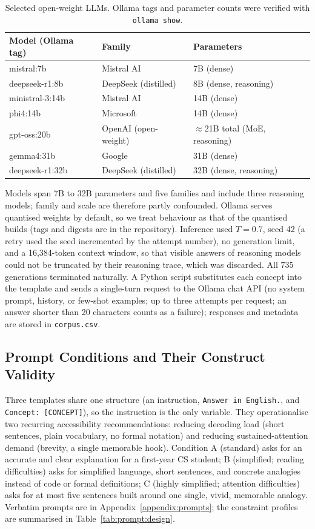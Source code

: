 \documentclass[journal,article,submit,pdftex,moreauthors]{Definitions/mdpi}
\begin{document}
\begin{table}[H]
\caption{Selected open-weight LLMs. Ollama tags and parameter counts were verified with \texttt{ollama show}.}
\label{tab:models:selected}
\centering
\small
\begin{tabular}{lll}
\toprule
Model (Ollama tag) & Family & Parameters \\
\midrule
mistral:7b & Mistral AI & 7B (dense) \\
deepseek-r1:8b & DeepSeek (distilled) & 8B (dense, reasoning) \\
ministral-3:14b & Mistral AI & 14B (dense) \\
phi4:14b & Microsoft & 14B (dense) \\
gpt-oss:20b & OpenAI (open-weight) & $\approx$21B total (MoE, reasoning) \\
gemma4:31b & Google & 31B (dense) \\
deepseek-r1:32b & DeepSeek (distilled) & 32B (dense, reasoning) \\
\bottomrule
\end{tabular}
\end{table}

Models span 7B to 32B parameters and five families and include three reasoning models; family and scale are therefore partly confounded. Ollama serves quantised weights by default, so we treat behaviour as that of the quantised builds (tags and digests are in the repository). Inference used $T = 0.7$, seed 42 (a retry used the seed incremented by the attempt number), no generation limit, and a 16,384-token context window, so that visible answers of reasoning models could not be truncated by their reasoning trace, which was discarded. All 735 generations terminated naturally. A Python script substitutes each concept into the template and sends a single-turn request to the Ollama chat API (no system prompt, history, or few-shot examples; up to three attempts per request; an answer shorter than 20 characters counts as a failure); responses and metadata are stored in \texttt{corpus.csv}.

\subsection{Prompt Conditions and Their Construct Validity}

Three templates share one structure (an instruction, \texttt{Answer in English.}, and \texttt{Concept: [CONCEPT]}), so the instruction is the only variable. They operationalise two recurring accessibility recommendations: reducing decoding load (short sentences, plain vocabulary, no formal notation) and reducing sustained-attention demand (brevity, a single memorable hook). Condition A (standard) asks for an accurate and clear explanation for a first-year CS student; B (simplified; reading difficulties) asks for simplified language, short sentences, and concrete analogies instead of code or formal definitions; C (highly simplified; attention difficulties) asks for at most five sentences built around one single, vivid, memorable analogy. Verbatim prompts are in Appendix~\ref{appendix:prompts}; the constraint profiles are summarised in Table~\ref{tab:prompt:design}.
\end{document}
